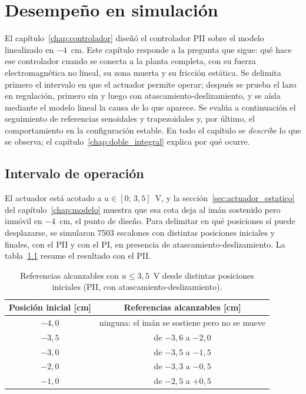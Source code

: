 \chapter{Desempeño en simulación}\label{chap:desempeno}

El capítulo~\ref{chap:controlador} diseñó el controlador PII sobre el modelo linealizado en $-4$~cm. Este capítulo responde a la pregunta que sigue: qué hace ese controlador cuando se conecta a la planta completa, con su fuerza electromagnética no lineal, su zona muerta y su fricción estática. Se delimita primero el intervalo en que el actuador permite operar; después se prueba el lazo en regulación, primero sin y luego con atascamiento-deslizamiento, y se aísla mediante el modelo lineal la causa de lo que aparece. Se evalúa a continuación el seguimiento de referencias senoidales y trapezoidales y, por último, el comportamiento en la configuración estable. En todo el capítulo se \emph{describe} lo que se observa; el capítulo~\ref{chap:doble_integral} explica por qué ocurre.

\section{Intervalo de operación}
\label{sec:intervalo}

El actuador está acotado a $u\in[0;\,3{,}5]$~V, y la sección~\ref{sec:actuador_estatico} del capítulo~\ref{chap:modelo} muestra que esa cota deja al imán sostenido pero inmóvil en $-4$~cm, el punto de diseño. Para delimitar en qué posiciones sí puede desplazarse, se simularon 7503 escalones con distintas posiciones iniciales y finales, con el PII y con el PI, en presencia de atascamiento-deslizamiento. La tabla~\ref{tab:intervalo} resume el resultado con el PII.

\begin{table}[ht]
\centering
\caption{Referencias alcanzables con $u\le3{,}5$~V desde distintas posiciones iniciales (PII, con atascamiento-deslizamiento).}
\label{tab:intervalo}
\begin{tabular}{|c|c|}
\hline
Posición inicial [cm] & Referencias alcanzables [cm] \\ \hline
$-4{,}0$ & ninguna: el imán se sostiene pero no se mueve \\ \hline
$-3{,}5$ & de $-3{,}6$ a $-2{,}0$ \\ \hline
$-3{,}0$ & de $-3{,}5$ a $-1{,}5$ \\ \hline
$-2{,}0$ & de $-3{,}3$ a $-0{,}5$ \\ \hline
$-1{,}0$ & de $-2{,}5$ a $+0{,}5$ \\ \hline
\end{tabular}
\end{table}

